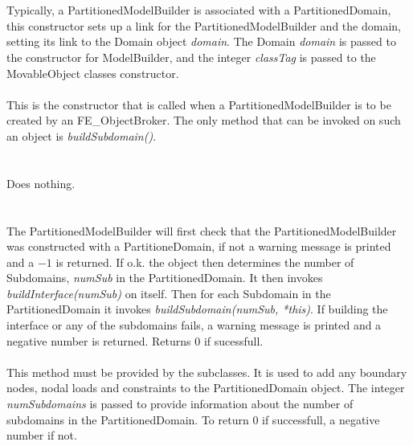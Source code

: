  \\ 
\\  
Typically, a PartitionedModelBuilder is associated with a PartitionedDomain,
this constructor sets up a link for the PartitionedModelBuilder and the domain,
setting its link to the Domain object {\em domain}. The Domain {\em
domain} is passed to the constructor for ModelBuilder, and the integer
{\em classTag} is passed to the MovableObject classes constructor. \\

\\  
This is the constructor that is called when a PartitionedModelBuilder
is to be created by an FE\_ObjectBroker. The only method that can be
invoked on such an object is {\em buildSubdomain()}. \\

 \\
\\ 
Does nothing. \\


 \\
 \\
The PartitionedModelBuilder will first check that the
PartitionedModelBuilder was constructed with a PartitioneDomain, if
not a warning message is printed and a $-1$ is returned. If o.k. the object 
then determines the number of Subdomains, {\em numSub} in the
PartitionedDomain. It then invokes {\em buildInterface(numSub)} on 
itself. Then for each Subdomain in the PartitionedDomain it invokes
{\em buildSubdomain(numSub, *this)}. If building the interface or any
of the subdomains fails, a warning message is printed and a negative
number is returned. Returns $0$ if sucessfull. \\

\\ 
This method must be provided by the subclasses. It is used to add any
boundary nodes, nodal loads and constraints to the PartitionedDomain
object. The integer {\em numSubdomains} is passed to provide
information about the number of subdomains in the
PartitionedDomain. To return $0$ if successfull, a negative number if not. \\


